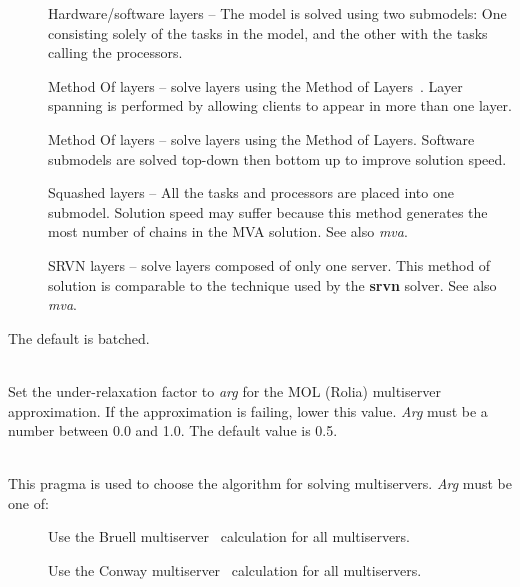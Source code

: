 \begin{description}
\begin{description}
\item[]
Hardware/software layers -- The model is solved using two submodels:
One consisting solely of the tasks in the model, and the other with the tasks calling the processors.
\item[]
Method Of layers -- solve layers using the Method of Layers~\cite{perf:rolia-95-ieeese-mol}. Layer spanning is performed by allowing clients to appear in more than one layer.
\item[]
Method Of layers -- solve layers using the Method of Layers.  Software submodels are solved top-down then bottom up to improve solution speed.
\item[]
Squashed layers -- All the tasks and processors are placed into one submodel.
Solution speed may suffer because this method generates the most number of chains in the MVA solution.  See also \emph{mva}.
\item[]
SRVN layers -- solve layers composed of only one server.
This method of solution is comparable to the technique used by the \textbf{srvn} solver.  See also \emph{mva}.
\end{description}
The default is batched.
\item[\optarg{mol-underrelaxation}{=\emph{arg}}]~\\
Set the under-relaxation factor to \emph{arg} for the MOL (Rolia) multiserver approximation.  If the approximation is failing, lower this value.
\emph{Arg} must be a number between 0.0 and 1.0.
The default value is 0.5.
\item[\optarg{multiserver}{=\emph{arg}}]~\\
This pragma is used to choose the algorithm for solving multiservers.
\emph{Arg} must be one of: 
\begin{description}
\item[]
Use the Bruell multiserver~\cite{queue:bruell-84-peva-load-dependent} calculation for all multiservers.
\item[]
Use the Conway multiserver~\cite{queue:deSouzaeSilva-87,queue:conway-88} calculation for all multiservers.

\end{description}
\end{description}
